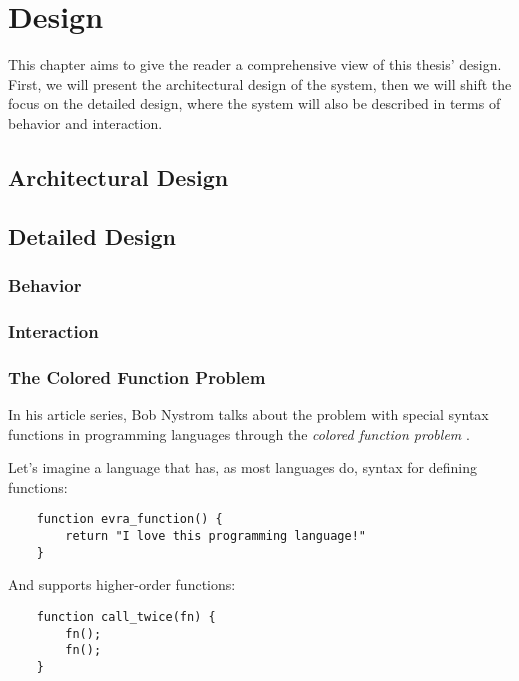 
\chapter{Design}
\label{chap:design}
This chapter aims to give the reader a comprehensive view of this thesis' design. First, we will present the architectural design of the system, then we will shift the focus on
the detailed design, where the system will also be described in terms of behavior and interaction.

\section{Architectural Design}
\label{sec:architectural-design}

\section{Detailed Design}
\label{sec:detailed-design}

\subsection{Behavior}

\subsection{Interaction}

\subsection*{The Colored Function Problem}
In his article series, Bob Nystrom talks about the problem with special syntax functions in programming languages through the \textit{colored function problem} \cite{003}.

Let's imagine a language that has, as most languages do, syntax for defining functions:

\begin{lstlisting}
    function evra_function() {
        return "I love this programming language!"
    }
\end{lstlisting}

And supports higher-order functions:

\begin{lstlisting}
    function call_twice(fn) {
        fn();
        fn();
    }
\end{lstlisting}

